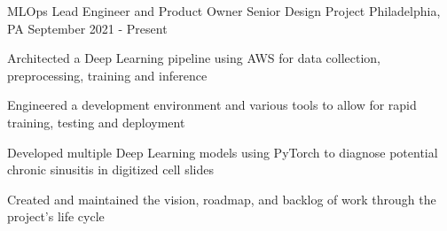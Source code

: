 
\begin{cventries}

	\cventry
	{MLOps Lead Engineer and Product Owner}
	{Senior Design Project}
	{Philadelphia, PA}
	{September 2021 - Present}
	{\begin{cvitems}
		\item {Architected a Deep Learning pipeline using AWS for data collection, preprocessing, training and inference}
		\item {Engineered a development environment and various tools to allow for rapid training, testing and deployment}
		\item {Developed multiple Deep Learning models using PyTorch to diagnose potential chronic sinusitis in digitized cell slides}
		\item {Created and maintained the vision, roadmap, and backlog of work through the project's life cycle}
	\end{cvitems}}


\end{cventries}